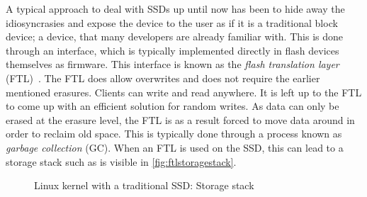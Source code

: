 A typical approach to deal with SSDs up until now has been to hide away the idiosyncrasies and expose the device to the user as if it is a traditional block device; a device, that many developers are already familiar with. This is done through an interface, which is typically implemented directly in flash devices themselves as firmware. This interface is known as the \textit{flash translation layer} (FTL)~\cite{chung2009survey}. The FTL does allow overwrites and does not require the earlier mentioned erasures. Clients can write and read anywhere. It is left up to the FTL to come up with an efficient solution for random writes. As data can only be erased at the erasure level, the FTL is as a result forced to move data around in order to reclaim old space. This is typically done through a process known as \textit{garbage collection} (GC). When an FTL is used on the SSD, this can lead to a storage stack such as is visible in \autoref{fig:ftlstoragestack}.

\begin{figure}[t!]
\centering
\begin{minipage}{0.45\textwidth}
  \centering
  
\end{minipage}%
\caption{ Linux kernel with a traditional SSD: Storage stack }
\label{fig:ftlstoragestack}
\end{figure}

